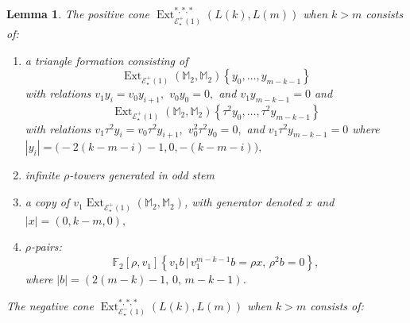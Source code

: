 \documentclass{amsart}
\newtheorem{lemma}[equation]{Lemma}
\theoremstyle{plain}
\numberwithin{equation}{section}
\numberwithin{figure}{section}
\DeclareMathOperator{\Ext}{Ext}
\newcommand{\mF}{{\mathbb F}}
\newcommand{\mM}{{\mathbb M}}
\newcommand{\cE}{{\mathcal E}}
\newcommand{\0}{\langle 0 \rangle }
\begin{document}
\begin{lemma}\label{lem:k>m}
The positive cone $\Ext_{\cE^{+}_\star(1)}^{*,*,*}(L(k), L(m))$ when $k > m$ consists of: 
\begin{enumerate}
\item a triangle formation consisting of \label{classes:positive triangle}
\[
\Ext_{\cE^{+}_{\star}(1)}\left(\mM_{2}, \mM_{2}\right) \left\{y_{0}, \ldots, y_{m-k-1} \right\}
\]
with relations $v_{1}y_{i} = v_{0}y_{i+1},$ $v_{0}y_{0} = 0,$ and $v_{1}y_{m-k-1} = 0$ and 
\[
\Ext_{\cE^{+}_{\star}(1)}\left(\mM_{2}, \mM_{2}\right) \left\{ \tau^{2}y_{0}, \ldots, \tau^{2}y_{m-k-1} \right\}
\]
with relations $v_{1} \tau^{2}y_{i} = v_{0}\tau^{2}y_{i+1},$ $v_{0}^{2}\tau^{2}y_{0} = 0,$ and $v_{1}\tau^2 y_{m-k-1} = 0$ where \newline $|y_{i}| = \big(-2(k-m - i)-1, 0, -(k-m - i)\big),$ 

     \item infinite $\rho$-towers generated in odd stem

      \item a copy of $v_{1}\Ext_{\cE^{+}_{\star}(1)}(\mM_{2}, \mM_{2})$, with generator denoted $x$ and $|x| = (0, k-m, 0),$\label{component 3 of pos cone}

    \item $\rho$-pairs: \[\mF_{2}[\rho, v_{1}] \left\{ v_1 b \, | \, v_{1}^{m-k-1}b = \rho x, \, \rho^{2}b = 0\right\}, \] where $|b| = (2(m-k)-1, \, 0, \, m-k-1)$. 
    \end{enumerate}

    The negative cone $\Ext_{\cE^{-}_\star(1)}^{*,*,*}(L(k), L(m))$ when $k > m$ consists of:



\end{lemma}
\end{document}
